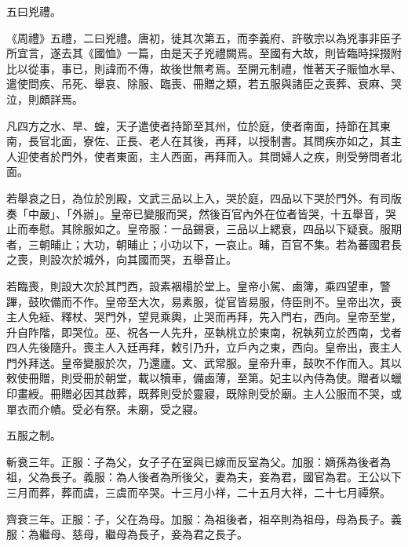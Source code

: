 
\begin{pinyinscope}

 五曰兇禮。



 《周禮》五禮，二曰兇禮。唐初，徙其次第五，而李義府、許敬宗以為兇事非臣子所宜言，遂去其《國恤》一篇，由是天子兇禮闕焉。至國有大故，則皆臨時採掇附比以從事，事已，則諱而不傳，故後世無考焉。至開元制禮，惟著天子賑恤水旱、遣使問疾、吊死、舉哀、除服、臨喪、冊贈之類，若五服與諸臣之喪葬、衰麻、哭泣，則頗詳焉。



 凡四方之水、旱、蝗，天子遣使者持節至其州，位於庭，使者南面，持節在其東南，長官北面，寮佐、正長、老人在其後，再拜，以授制書。其問疾亦如之，其主人迎使者於門外，使者東面，主人西面，再拜而入。其問婦人之疾，則受勞問者北面。



 若舉哀之日，為位於別殿，文武三品以上入，哭於庭，四品以下哭於門外。有司版奏「中嚴」、「外辦」。皇帝已變服而哭，然後百官內外在位者皆哭，十五舉音，哭止而奉慰。其除服如之。皇帝服：一品錫衰，三品以上緦衰，四品以下疑衰。服期者，三朝晡止；大功，朝晡止；小功以下，一哀止。晡，百官不集。若為蕃國君長之喪，則設次於城外，向其國而哭，五舉音止。



 若臨喪，則設大次於其門西，設素裀榻於堂上。皇帝小駕、鹵簿，乘四望車，警蹕，鼓吹備而不作。皇帝至大次，易素服，從官皆易服，侍臣則不。皇帝出次，喪主人免絰、釋杖、哭門外，望見乘輿，止哭而再拜，先入門右，西向。皇帝至堂，升自阼階，即哭位。巫、祝各一人先升，巫執桃立於東南，祝執茢立於西南，戈者四人先後隨升。喪主人入廷再拜，敕引乃升，立戶內之東，西向。皇帝出，喪主人門外拜送。皇帝變服於次，乃還廬。文、武常服。皇帝升車，鼓吹不作而入。其以敕使冊贈，則受冊於朝堂，載以犢車，備鹵薄，至第。妃主以內侍為使。贈者以蠟印畫綬。冊贈必因其啟葬，既葬則受於靈寢，既除則受於廟。主人公服而不哭，或單衣而介幘。受必有祭。未廟，受之寢。



 五服之制。



 斬衰三年。正服：子為父，女子子在室與已嫁而反室為父。加服：嫡孫為後者為祖，父為長子。義服：為人後者為所後父，妻為夫，妾為君，國官為君。王公以下三月而葬，葬而虞，三虞而卒哭。十三月小祥，二十五月大祥，二十七月禫祭。



 齊衰三年。正服：子，父在為母。加服：為祖後者，祖卒則為祖母，母為長子。義服：為繼母、慈母，繼母為長子，妾為君之長子。




\end{pinyinscope}
